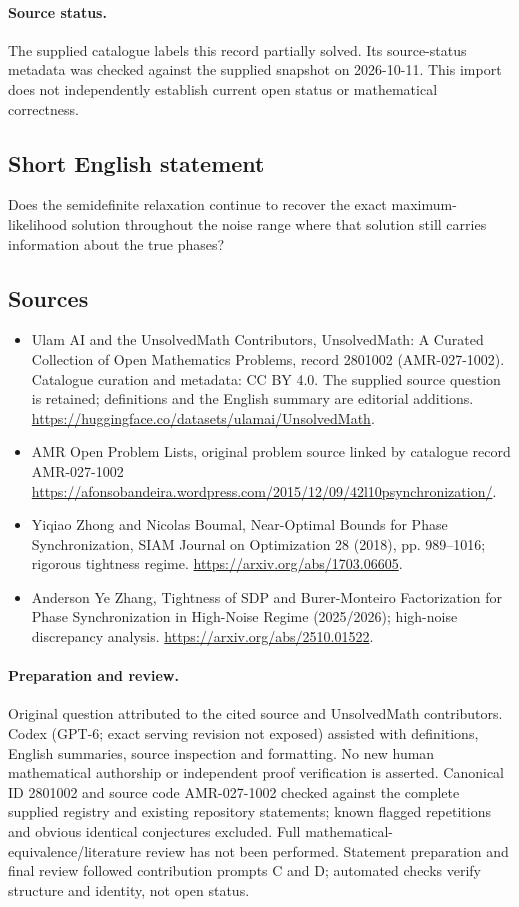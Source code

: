 \documentclass[11pt]{article}
\begin{document}
\paragraph{Source status.}
The supplied catalogue labels this record partially solved. Its source-status metadata was checked against the supplied snapshot on 2026-10-11. This import does not independently establish current open status or mathematical correctness.
\subsection{Short English statement}
Does the semidefinite relaxation continue to recover the exact maximum-likelihood solution throughout the noise range where that solution still carries information about the true phases?
\subsection{Sources}
\begin{itemize}
\item[\hypertarget{source:2801002:1}{S1}] Ulam AI and the UnsolvedMath Contributors, UnsolvedMath: A Curated Collection of Open Mathematics Problems, record 2801002 (AMR-027-1002). Catalogue curation and metadata: CC BY 4.0. The supplied source question is retained; definitions and the English summary are editorial additions.
\url{https://huggingface.co/datasets/ulamai/UnsolvedMath}.
\item[\hypertarget{source:2801002:2}{S2}] AMR Open Problem Lists, original problem source linked by catalogue record AMR-027-1002
\url{https://afonsobandeira.wordpress.com/2015/12/09/42l10psynchronization/}.
\item[\hypertarget{source:2801002:3}{S3}] Yiqiao Zhong and Nicolas Boumal, Near-Optimal Bounds for Phase Synchronization, SIAM Journal on Optimization 28 (2018), pp. 989--1016; rigorous tightness regime.
\url{https://arxiv.org/abs/1703.06605}.
\item[\hypertarget{source:2801002:4}{S4}] Anderson Ye Zhang, Tightness of SDP and Burer-Monteiro Factorization for Phase Synchronization in High-Noise Regime (2025/2026); high-noise discrepancy analysis.
\url{https://arxiv.org/abs/2510.01522}.
\end{itemize}
\paragraph{Preparation and review.}
Original question attributed to the cited source and UnsolvedMath contributors. Codex (GPT-6; exact serving revision not exposed) assisted with definitions, English summaries, source inspection and formatting. No new human mathematical authorship or independent proof verification is asserted. Canonical ID 2801002 and source code AMR-027-1002 checked against the complete supplied registry and existing repository statements; known flagged repetitions and obvious identical conjectures excluded. Full mathematical-equivalence/literature review has not been performed. Statement preparation and final review followed contribution prompts C and D; automated checks verify structure and identity, not open status.
\label{end:2801002}
\end{document}
